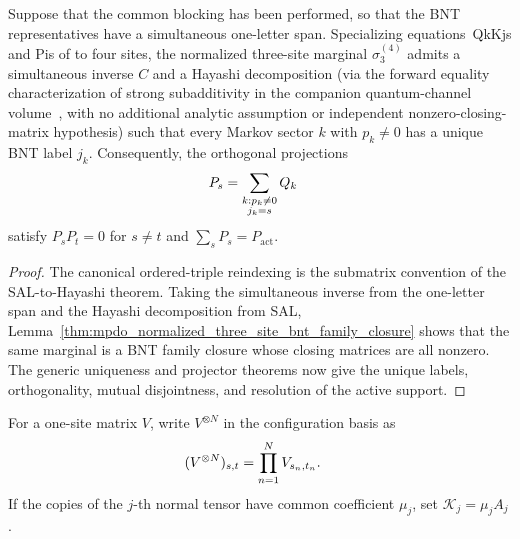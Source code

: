 \begin{lemma}
    \label{thm:mpdo_four_site_sal_bnt_sector_projectors}
    \leanok
    Suppose that the common blocking has been performed, so that the BNT
    representatives have a simultaneous one-letter span. Specializing
    equations~\textup{QkKjs} and \textup{Pis} of
    \cite[Appendix~C.2, lines~1714--1737]{Cirac2016MPDO_arXiv} to four sites,
    the normalized three-site marginal $\sigma_3^{(4)}$ admits a simultaneous
    inverse $C$ and a Hayashi decomposition (via the forward equality
    characterization of strong subadditivity in the companion quantum-channel
    volume~\cite[``Hayashi SSA-equality characterization'']{QICLean2026Blueprint},
    with no additional analytic assumption or independent
    nonzero-closing-matrix hypothesis) such that every Markov sector $k$ with
    $p_k\ne0$ has a unique BNT label $j_k$. Consequently, the orthogonal
    projections
    \begin{align}
        P_s
         & =\sum_{\substack{k:p_k\ne0 \\j_k=s}}Q_k
        \notag
    \end{align}
    satisfy $P_sP_t=0$ for $s\ne t$ and $\sum_sP_s=P_{\mathrm{act}}$.
\end{lemma}

\begin{proof}\leanok
    The canonical ordered-triple reindexing is the submatrix convention of
    the SAL-to-Hayashi theorem. Taking the simultaneous inverse from the
    one-letter span and the Hayashi decomposition from SAL,
    Lemma~\ref{thm:mpdo_normalized_three_site_bnt_family_closure} shows that
    the same marginal is a BNT family closure whose closing matrices are all
    nonzero. The generic uniqueness and projector theorems now give the unique
    labels, orthogonality, mutual disjointness, and resolution of the active
    support.
\end{proof}

\begin{definition}
    \label{def:mpdo_sitewise_physical_matrix}
    \leanok
    For a one-site matrix $V$, write $V^{\otimes N}$ in the configuration
    basis as
    \begin{align}
        (V^{\otimes N})_{s,t}
         & =\prod_{n=1}^{N}V_{s_n,t_n}.
        \notag
    \end{align}
    If the copies of the $j$-th normal tensor have common coefficient
    $\mu_j$, set $\mathcal K_j=\mu_j A_j$.
\end{definition}

